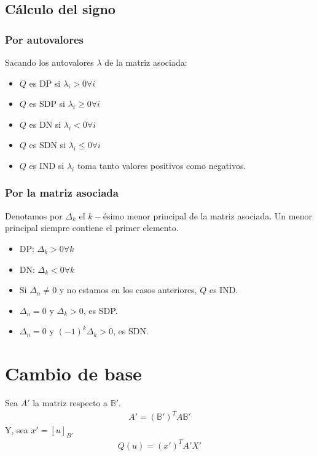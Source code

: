 \documentclass{article}
\begin{document}
\subsection{Cálculo del signo}
\subsubsection{Por autovalores}
Sacando los autovalores $\lambda$ de la matriz asociada:
\begin{itemize}
	\item $Q$ es DP si $\lambda_{i} > 0 \forall i$
	\item $Q$ es SDP si $\lambda_{i} \geq 0 \forall i$
	\item $Q$ es DN si $\lambda_{i} < 0 \forall i$
	\item $Q$ es SDN si $\lambda_{i} \leq 0 \forall i$
	\item $Q$ es IND si $\lambda_{i}$ toma tanto valores
		positivos como negativos.
\end{itemize}
\subsubsection{Por la matriz asociada}
Denotamos por $\Delta_{k}$ el $k-$ésimo menor principal de la
matriz asociada. Un menor principal siempre contiene el primer
elemento.
\begin{itemize}
	\item DP: $\Delta_{k} > 0 \forall k$
	\item DN: $\Delta_{k} < 0 \forall k$
	\item Si $\Delta_{n} \neq 0$ y no estamos en los
		casos anteriores, $Q$ es IND.
	\item $\Delta_{n}=0$ y $\Delta_{k}>0$, es SDP.
	\item $\Delta_{n}=0$ y $(-1)^{k}\Delta_{k} >0$, es SDN.  
\end{itemize}
\section{Cambio de base}
Sea $A'$ la matriz respecto a $\mathbb{B}'$.
\begin{equation}
	\begin{split}
		A'=(\mathbb{B}')^{T}A \mathbb{B}'
	\end{split}
\end{equation}
Y, sea $x'=[u]_{B'}$
\begin{equation}
	\begin{split}
		Q(u)=(x')^{T}A'X'
	\end{split}
\end{equation}
\end{document}
